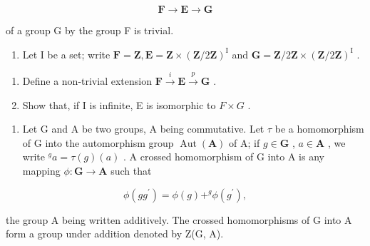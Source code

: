 \[
\mathbf {F} \rightarrow \mathbf {E} \rightarrow \mathbf {G}
\]

of a group G by the group F is trivial.

\begin{enumerate}
\def\labelenumi{\arabic{enumi}.}
\setcounter{enumi}{5}
\tightlist
\item
  Let I be a set; write \(\mathbf{F} = \mathbf{Z}, \mathbf{E} = \mathbf{Z} \times (\mathbf{Z}/2\mathbf{Z})^{\mathrm{I}}\) and \(\mathbf{G} = \mathbf{Z}/2\mathbf{Z} \times (\mathbf{Z}/2\mathbf{Z})^{\mathrm{I}}\) .
\end{enumerate}

\begin{enumerate}
\def\labelenumi{(\alph{enumi})}
\item
  Define a non-trivial extension \(\mathbf{F} \xrightarrow{i} \mathbf{E} \xrightarrow{p} \mathbf{G}\) .
\item
  Show that, if I is infinite, E is isomorphic to \(F \times G\) .
\end{enumerate}

\begin{enumerate}
\def\labelenumi{\arabic{enumi}.}
\setcounter{enumi}{6}
\tightlist
\item
  Let G and A be two groups, A being commutative. Let \(\tau\) be a homomorphism of G into the automorphism group \(\operatorname{Aut}(\mathbf{A})\) of A; if \(g \in \mathbf{G}\) , \(a \in \mathbf{A}\) , we write \(^g a = \tau(g)(a)\) . A crossed homomorphism of G into A is any mapping \(\phi: \mathbf{G} \to \mathbf{A}\) such that
\end{enumerate}

\[
\phi (g g ^ {\prime}) = \phi (g) + ^ {g} \phi (g ^ {\prime}),
\]

the group A being written additively. The crossed homomorphisms of G into A form a group under addition denoted by Z(G, A).

